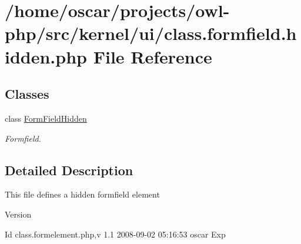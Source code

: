 \section{/home/oscar/projects/owl-\/php/src/kernel/ui/class.formfield.hidden.php File Reference}
\label{class_8formfield_8hidden_8php}
\subsection*{Classes}
\begin{DoxyCompactItemize}
\item 
class \hyperlink{classFormFieldHidden}{FormFieldHidden}
\begin{DoxyCompactList}\small\item\em Formfield. \item\end{DoxyCompactList}\end{DoxyCompactItemize}


\subsection{Detailed Description}
This file defines a hidden formfield element \begin{DoxyVersion}{Version}

\end{DoxyVersion}
\begin{DoxyParagraph}{Id}
class.formelement.php,v 1.1 2008-\/09-\/02 05:16:53 oscar Exp 
\end{DoxyParagraph}
